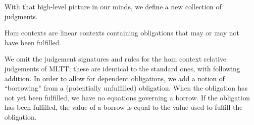 \documentclass[final]{amsart}
\begin{document}
With that high-level picture in our minds, we define a new collection of judgments.


Hom contexts are linear contexts containing obligations that
may or may not have been fulfilled.


We omit the judgement signatures and rules for the hom context relative judgements
of MLTT; these are identical to the standard ones, with following addition.
In order to allow for dependent obligations, we add a notion of ``borrowing''
from a (potentially unfulfilled) obligation. When the obligation has not
yet been fulfilled, we have no equations governing a borrow. If the obligation
has been fulfilled, the value of a borrow is equal to the value used to
fulfill the obligation.
\end{document}
